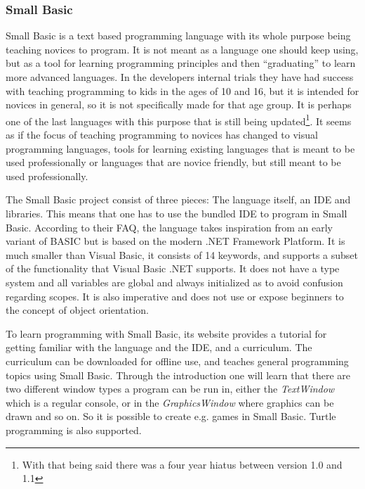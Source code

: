 \subsubsection{Small Basic}
Small Basic is a text based programming language with its whole purpose being teaching novices to program. It is not meant as a language one should keep using, but as a tool for learning programming principles and then ``graduating'' to learn more advanced languages. In the developers internal trials they have had success with teaching programming to kids in the ages of 10 and 16, but it is intended for novices in general, so it is not specifically made for that age group\cite{smallbasic_faq}. It is perhaps one of the last languages with this purpose that is still being updated\footnote{With that being said there was a four year hiatus between version 1.0 and 1.1}. It seems as if the focus of teaching programming to novices has changed to visual programming languages, tools for learning existing languages that is meant to be used professionally or languages that are novice friendly, but still meant to be used professionally.

The Small Basic project consist of three pieces: The language itself, an IDE and libraries. This means that one has to use the bundled IDE to program in Small Basic. According to their FAQ\cite{smallbasic_faq}, the language takes inspiration from an early variant of BASIC but is based on the modern .NET Framework Platform. It is much smaller than Visual Basic, it consists of 14 keywords, and supports a subset of the functionality that Visual Basic .NET supports. It does not have a type system and all variables are global and always initialized as to avoid confusion regarding scopes. It is also imperative and does not use or expose beginners to the concept of object orientation.

To learn programming with Small Basic, its website provides a tutorial for getting familiar with the language and the IDE\cite{smallbasic_intro}, and a curriculum. The curriculum can be downloaded for offline use, and teaches general programming topics using Small Basic\cite{smallbasic_curriculum}. Through the introduction one will learn that there are two different window types a program can be run in, either the \emph{TextWindow} which is a regular console, or in the \emph{GraphicsWindow} where graphics can be drawn and so on. So it is possible to create e.g. games in Small Basic. Turtle programming is also supported.

